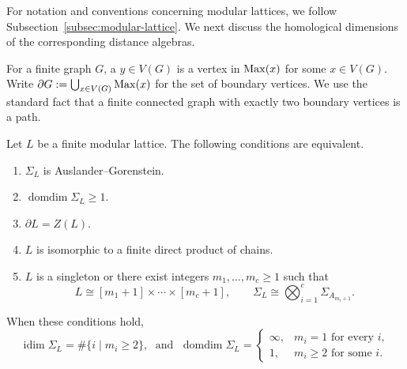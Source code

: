 \documentclass[a4paper,leqno]{amsart}
\begin{document}
For notation and conventions concerning modular lattices, we follow Subsection~\ref{subsec:modular-lattice}. We next discuss the homological dimensions of the corresponding distance algebras.

For a finite graph $G$, a  $y\in V(G)$ is a vertex in $\operatorname{Max}(x)$ for some $x\in V(G)$.
Write $\partial G:=\bigcup_{x\in V(G)}\operatorname{Max}(x)$ for the set of boundary vertices.
We use the standard fact that a finite connected graph with exactly two boundary vertices is a path. 

\begin{thm}\label{thm:modular-lattice-AG}
Let $L$ be a finite modular lattice. The following conditions are
equivalent.
\begin{enumerate}
    \item $\Sigma_L$ is Auslander--Gorenstein.
    \item $\operatorname{domdim}\Sigma_L\geq1$.
    \item $\partial L=Z(L)$.
    \item $L$ is isomorphic to a finite direct product of chains.
    \item $L$ is a singleton or there exist integers $m_1,\ldots,m_c\geq1$ such that
    \[
    L\cong[m_1+1]\times\cdots\times[m_c+1],
    \qquad
    \Sigma_L\cong\bigotimes_{i=1}^c\Sigma_{A_{m_i+1}}.
    \]
\end{enumerate}
When these conditions hold,
\[
\operatorname{idim}\Sigma_L
=\#\{i\mid m_i\geq2\},\; \text{ and }\;
\operatorname{domdim}\Sigma_L=
\begin{cases}
\infty, & m_i=1\text{ for every }i,\\
1, & m_i\geq2\text{ for some }i.
\end{cases}
\]
\end{thm}
\end{document}
